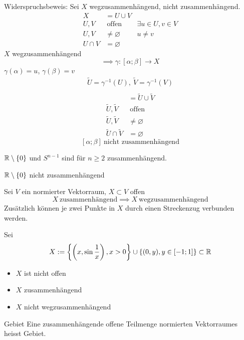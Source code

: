 \begin{Bew}
  Widerspruchsbeweis: Sei $X$ wegzusammenhängend, nicht zusammenhängend.
  \begin{align*}
    X&=U\cup V\\
    U,V&\ \text{offen}&\exists u\in U, v\in V\\
    U,V&\neq\varnothing&u\neq v\\
    U\cap V&=\varnothing
  \end{align*}
  $X$ wegzusammenhängend
  \[\implies \gamma:[\alpha;\beta]\to X\]
  $\gamma(\alpha)=u$, $\gamma(\beta)=v$
  \begin{gather*}
    \tilde U=\gamma^{-1}(U),\ \tilde V=\gamma^{-1}(V)\\
  \end{gather*}
  \begin{align*}
    [\alpha;\beta]&=\tilde U\cup \tilde V\\
    \tilde U,\tilde V&\ \text{offen}\\
    \tilde U,\tilde V&\neq\varnothing\\
    \tilde U\cap\tilde V&=\varnothing
  \end{align*}
  \[ [\alpha;\beta]\ \text{nicht zusammenhängend}\]
\end{Bew}
\begin{Kor}
  $\mathbb{R}\setminus\left\{ 0 \right\}$ und $S^{n-1}$ sind für $n\geq 2$ zusammenhängend.
\end{Kor}
\begin{Bew}
  $\mathbb{R}\setminus\left\{ 0 \right\}$ nicht zusammenhängend
\end{Bew}
\begin{Sat}
  Sei $V$ ein normierter Vektorraum, $X\subset V$ offen
  \[X\ \text{zusammenhängend}\implies X\ \text{wegzusammenhängend}\]
  Zusätzlich können je zwei Punkte in $X$ durch einen Streckenzug verbunden werden.
\end{Sat}
\begin{Bem}
  Sei 
  \[X:=\left\{ \left( x,\sin\frac{1}{x} \right),x>0 \right\}\cup \left\{ (0,y),y\in [-1;1] \right\}\subset\mathbb{R}\]
  \begin{itemize}
    \item $X$ ist nicht offen
    \item $X$ zusammenhängend
    \item $X$ nicht wegzusammenhängend
  \end{itemize}
\end{Bem}
\begin{Def}{Gebiet}
  Eine zusammenhängende offene Teilmenge normierten Vektorraumes heisst Gebiet.
\end{Def}
